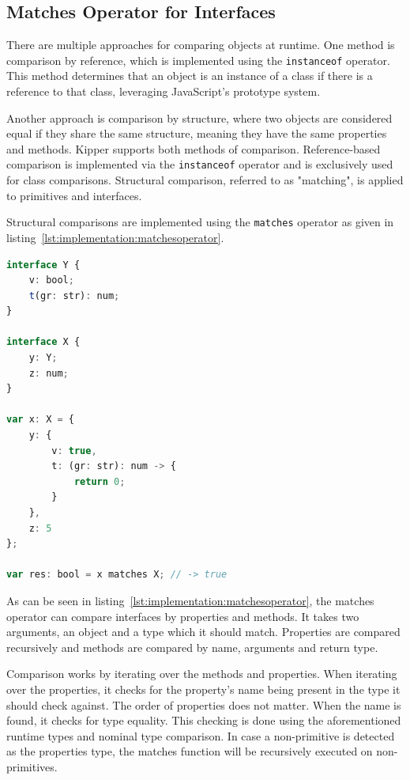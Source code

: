 \subsection{Matches Operator for Interfaces}
\label{subsec:matches}

There are multiple approaches for comparing objects at runtime. One method is comparison by reference, which is implemented using the \lstinline|instanceof| operator. This method determines that an object is an instance of a class if there is a reference to that class, leveraging JavaScript's prototype system.

Another approach is comparison by structure, where two objects are considered equal if they share the same structure, meaning they have the same properties and methods. Kipper supports both methods of comparison. Reference-based comparison is implemented via the \lstinline|instanceof| operator and is exclusively used for class comparisons. Structural comparison, referred to as "matching", is applied to primitives and interfaces. 

Structural comparisons are implemented using the \lstinline|matches| operator as given in listing~\ref{lst:implementation:matchesoperator}.

\begin{lstlisting}[language=Typescript,caption=The Kipper matches operator,label=lst:implementation:matchesoperator]
interface Y {
	v: bool;
	t(gr: str): num;
}

interface X {
	y: Y;
	z: num;
}

var x: X = {
	y: {
		v: true,
		t: (gr: str): num -> {
			return 0;
		}
	},
	z: 5
};

var res: bool = x matches X; // -> true
\end{lstlisting}

As can be seen in listing~\ref{lst:implementation:matchesoperator}, the matches operator can compare interfaces by properties and methods. It takes two arguments, an object and a type which it should match. Properties are compared recursively and methods are compared by name, arguments and return type.

Comparison works by iterating over the methods and properties. When iterating over the properties, it checks for the property's name being present in the type it should check against. The order of properties does not matter. When the name is found, it checks for type equality. This checking is done using the aforementioned runtime types and nominal type comparison. In case a non-primitive is detected as the properties type, the matches function will be recursively executed on non-primitives.

